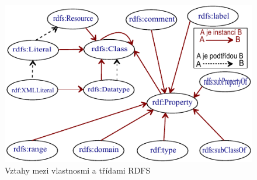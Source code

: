\documentclass{projekt}
\begin{document}
\begin{figure}[htb]
\begin{center}
\includegraphics[scale=1.4]{rdfs.pdf}
\caption{Vztahy mezi vlastnosmi a třídami RDFS}
\end{center}
\end{figure}




\end{document}
